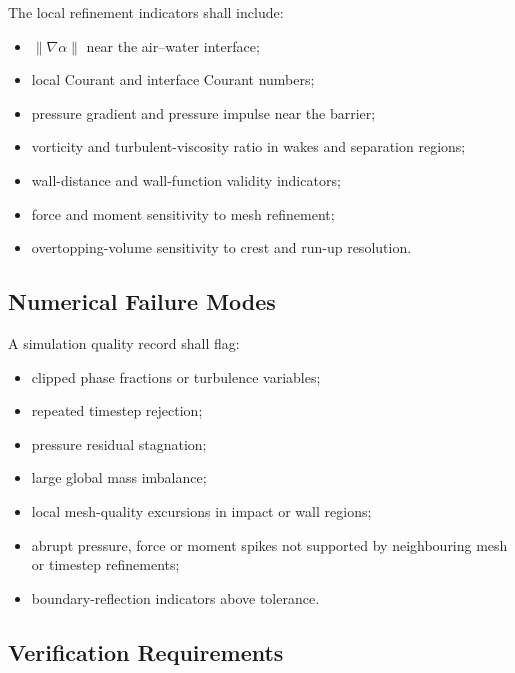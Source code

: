 
The local refinement indicators shall include:

\begin{itemize}
  \item $\lVert\nabla\alpha\rVert$ near the air--water interface;
  \item local Courant and interface Courant numbers;
  \item pressure gradient and pressure impulse near the barrier;
  \item vorticity and turbulent-viscosity ratio in wakes and
    separation regions;
  \item wall-distance and wall-function validity indicators;
  \item force and moment sensitivity to mesh refinement;
  \item overtopping-volume sensitivity to crest and run-up resolution.
\end{itemize}

\subsection{Numerical Failure Modes}
\label{sec:res-num-err-numerical-failure-modes}


A simulation quality record shall flag:

\begin{itemize}
  \item clipped phase fractions or turbulence variables;
  \item repeated timestep rejection;
  \item pressure residual stagnation;
  \item large global mass imbalance;
  \item local mesh-quality excursions in impact or wall regions;
  \item abrupt pressure, force or moment spikes not supported by
    neighbouring mesh or timestep refinements;
  \item boundary-reflection indicators above tolerance.
\end{itemize}

\subsection{Verification Requirements}
\label{sec:res-num-err-verification-requirements}


